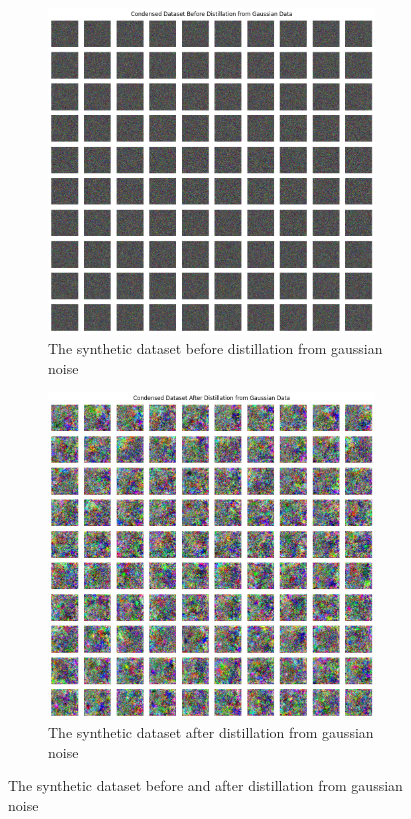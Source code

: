 \documentclass[onecolumn]{IEEEtran}
\begin{document}
\begin{figure}[H]
    \centering
    \begin{subfigure}{.5\textwidth}
        \centering
        \includegraphics[width=0.95\textwidth]{images/MHIST_datadam_before_distil_gaussian.png}
        \caption{The synthetic dataset before distillation from gaussian noise}
        \label{fig:MHIST_datadam_before_distil_gaussian}
    \end{subfigure}%
    \begin{subfigure}{.5\textwidth}
        \centering
        \includegraphics[width=0.95\textwidth]{images/MHIST_datadam_after_distil_gaussian.png}
        \caption{The synthetic dataset after distillation from gaussian noise}
        \label{fig:MHIST_datadam_after_distil_gaussian}
    \end{subfigure}
    \caption{The synthetic dataset before and after distillation from gaussian noise}
\end{figure}
\end{document}
